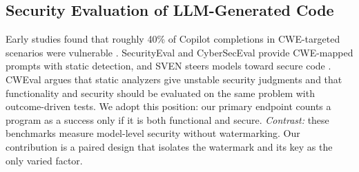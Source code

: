 \subsection{Security Evaluation of LLM-Generated Code}
Early studies found that roughly 40\% of Copilot completions in CWE-targeted scenarios were vulnerable \citep{pearce2022asleep}. SecurityEval \citep{siddiq2022securityeval} and CyberSecEval \citep{bhatt2023cyberseceval} provide CWE-mapped prompts with static detection, and SVEN steers models toward secure code \citep{he2023sven}. CWEval \citep{peng2025cweval} argues that static analyzers give unstable security judgments and that functionality and security should be evaluated on the same problem with outcome-driven tests. We adopt this position: our primary endpoint counts a program as a success only if it is both functional and secure. \emph{Contrast:} these benchmarks measure model-level security without watermarking. Our contribution is a paired design that isolates the watermark and its key as the only varied factor.

